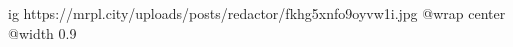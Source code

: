  
 
 
 
 

\ifcmt
  ig https://mrpl.city/uploads/posts/redactor/fkhg5xnfo9oyvw1i.jpg
  @wrap center
  @width 0.9
\fi
